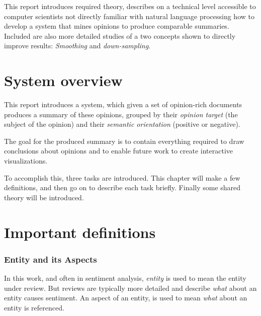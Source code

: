\documentclass[a4paper,11pt]{kth-mag}
\newcommand{\gls}[1]{TODO(#1)}
\begin{document}
This report introduces required theory, describes on a technical level accessible to computer scientists
not directly familiar with natural language processing how to develop a system that
mines opinions to produce comparable summaries. Included are also more detailed studies of a two concepts
shown to directly improve results: \emph{Smoothing} and \emph{down-sampling}.


%
%



\section{System overview}
This report introduces a system, which given a set of opinion-rich documents produces a summary of these
opinions, grouped by their \emph{opinion target} (the subject of the opinion)
and their \emph{semantic orientation} (positive or negative).

The goal for the produced summary is to contain everything required to draw conclusions about opinions
and to enable future work to create interactive visualizations.

To accomplish this, three tasks are introduced. This chapter will make a few definitions, and then go on to
describe each task briefly. Finally some shared theory will be introduced.



\section{Important definitions}

\subsubsection{Entity and its Aspects}
In this work, and often in sentiment analysis, \emph{entity} is used to mean the entity under review. But reviews are typically more detailed
and describe \emph{what} about an entity causes sentiment. An aspect of an entity, is used to mean \emph{what} about an entity is referenced.
\end{document}
